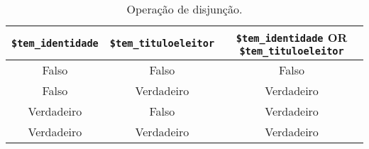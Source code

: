 \begin{table}[H]
\caption{Operação de disjunção.}\label{tab:cap4-operacao-de-disjuncao}
\begin{center}
\begin{tabular}{|c|c|c|}
\hline
  \multicolumn{1}{|c|}{ \textbf{\texttt{\$tem\_identidade}}}
&  \multicolumn{1}{|c|}{ \textbf{\texttt{\$tem\_tituloeleitor}}}
&  \multicolumn{1}{|c|}{ \textbf{\texttt{\$tem\_identidade} OR \texttt{\$tem\_tituloeleitor}}} \\
\hline
\hline
Falso  & Falso & Falso\\ \hline
Falso  & Verdadeiro & Verdadeiro\\ \hline
Verdadeiro  & Falso & Verdadeiro\\ \hline
Verdadeiro  & Verdadeiro & Verdadeiro\\ \hline
\end{tabular}
\end{center}
\end{table}
